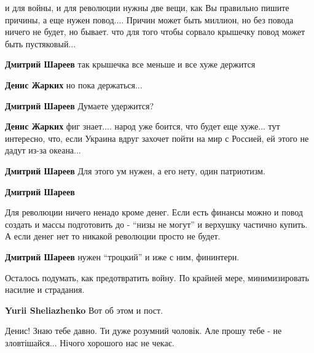  
 
 
 
 
\zzSecCmt

\begin{itemize} %

и для войны, и для революции нужны две вещи, как Вы правильно пишите причины, а
еще нужен повод.... Причин может быть миллион, но без повода ничего не будет,
но бывает. что для того чтобы сорвало крышечку повод может быть пустяковый...

\begin{itemize} %
\textbf{Дмитрий Шареев} так крышечка все меньше и все хуже держится

\textbf{Денис Жарких} но пока держаться...

\textbf{Дмитрий Шареев} Думаете удержится?

\textbf{Денис Жарких} фиг знает.... народ уже боится, что будет еще хуже... тут интересно, что, если Украина вдруг захочет пойти на мир с Россией, ей этого не дадут из-за океана...

\textbf{Дмитрий Шареев} Для этого ум нужен, а его нету, один патриотизм.

\textbf{Дмитрий Шареев} 

Для революции ничего ненадо кроме денег. Если есть финансы можно и повод
создать и массы подготовить до - \enquote{низы не могут} и верхушку частично купить. А
если денег нет то никакой революции просто не будет.


\textbf{Дмитрий Шареев}
нужен \enquote{троцкий} и иже с ним, фининтерн.
\end{itemize} %

Осталось подумать, как предотвратить войну. По крайней мере, минимизировать насилие и страдания.

\textbf{Yurii Sheliazhenko} Вот об этом и пост.


Денис! Знаю тебе давно. Ти дуже розумний чоловік. Але прошу тебе - не
зловтішайся... Нічого хорошого нас не чекає.


\end{itemize}
